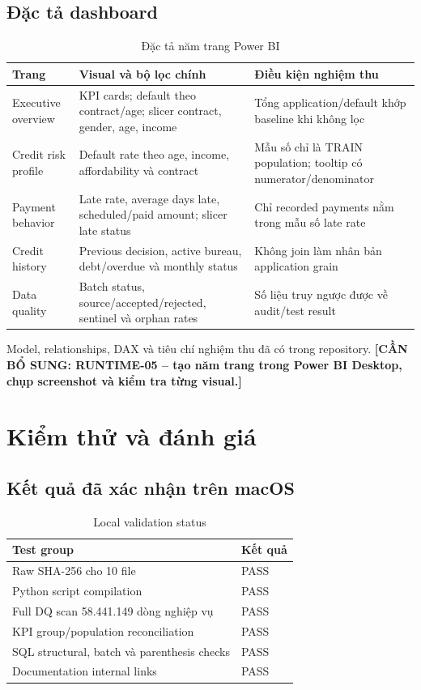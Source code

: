 \documentclass[12pt,a4paper,oneside]{report}
\newcommand{\pending}[1]{\textcolor{warning}{\textbf{[CẦN BỔ SUNG: #1]}}}
\begin{document}
\section{Đặc tả dashboard}
\begin{table}[H]
\centering
\caption{Đặc tả năm trang Power BI}\label{tab:dashboard}
\begin{tabularx}{\textwidth}{p{2.7cm}XX}
\toprule
Trang & Visual và bộ lọc chính & Điều kiện nghiệm thu \\
\midrule
Executive overview & KPI cards; default theo contract/age; slicer contract, gender, age, income & Tổng application/default khớp baseline khi không lọc \\
Credit risk profile & Default rate theo age, income, affordability và contract & Mẫu số chỉ là TRAIN population; tooltip có numerator/denominator \\
Payment behavior & Late rate, average days late, scheduled/paid amount; slicer late status & Chỉ recorded payments nằm trong mẫu số late rate \\
Credit history & Previous decision, active bureau, debt/overdue và monthly status & Không join làm nhân bản application grain \\
Data quality & Batch status, source/accepted/rejected, sentinel và orphan rates & Số liệu truy ngược được về audit/test result \\
\bottomrule
\end{tabularx}
\end{table}
Model, relationships, DAX và tiêu chí nghiệm thu đã có trong repository. \pending{RUNTIME-05 -- tạo năm trang trong Power BI Desktop, chụp screenshot và kiểm tra từng visual.}

\chapter{Kiểm thử và đánh giá}
\section{Kết quả đã xác nhận trên macOS}
\begin{table}[H]
\centering
\caption{Local validation status}\label{tab:local-tests}
\begin{tabularx}{\textwidth}{Xl}
\toprule
Test group & Kết quả \\
\midrule
Raw SHA-256 cho 10 file & PASS \\
Python script compilation & PASS \\
Full DQ scan 58.441.149 dòng nghiệp vụ & PASS \\
KPI group/population reconciliation & PASS \\
SQL structural, batch và parenthesis checks & PASS \\
Documentation internal links & PASS \\
\bottomrule
\end{tabularx}
\end{table}
\end{document}

